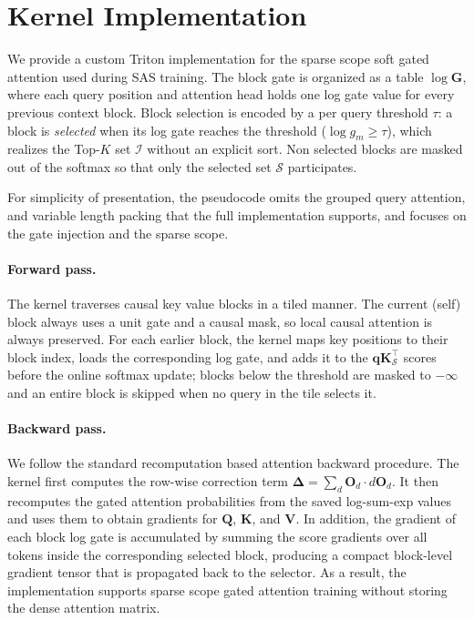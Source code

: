 \section{Kernel Implementation}
\label{sec:app_kernel}

We provide a custom Triton implementation for the sparse scope soft gated attention used during SAS training.
The block gate is organized as a table $\log\mathbf{G}$, where each query position and attention head holds one log gate value for every previous context block.
Block selection is encoded by a per query threshold $\tau$: a block is \emph{selected} when its log gate reaches the threshold ($\log g_m\ge\tau$), which realizes the Top-$K$ set $\mathcal{I}$ without an explicit sort. Non selected blocks are masked out of the softmax so that only the selected set $\mathcal{S}$ participates.

For simplicity of presentation, the pseudocode omits the grouped query attention, and variable length packing that the full implementation supports, and focuses on the gate injection and the sparse scope.

\paragraph{Forward pass.}
The kernel traverses causal key value blocks in a tiled manner.
The current (self) block always uses a unit gate and a causal mask, so local causal attention is always preserved.
For each earlier block, the kernel maps key positions to their block index, loads the corresponding log gate, and adds it to the $\mathbf{q}\mathbf{K}_{\mathcal{S}}^\top$ scores before the online softmax update; blocks below the threshold are masked to $-\infty$ and an entire block is skipped when no query in the tile selects it.

\paragraph{Backward pass.}
We follow the standard recomputation based attention backward procedure.
The kernel first computes the row-wise correction term $\mathbf{\Delta}=\sum_d\mathbf{O}_d\cdot d\mathbf{O}_d$.
It then recomputes the gated attention probabilities from the saved log-sum-exp values and uses them to obtain gradients for $\mathbf{Q}$, $\mathbf{K}$, and $\mathbf{V}$.
In addition, the gradient of each block log gate is accumulated by summing the score gradients over all tokens inside the corresponding selected block, producing a compact block-level gradient tensor that is propagated back to the selector.
As a result, the implementation supports sparse scope gated attention training without storing the dense attention matrix.

